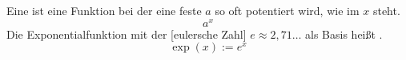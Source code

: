 Eine  ist eine Funktion bei der eine feste  $a$ so oft potentiert wird, wie im  $x$ steht.
$$a^x$$
Die Exponentialfunktion mit der [eulersche Zahl] $e \approx 2,71\dots$ als Basis heißt .
$$\exp(x) := e^x$$